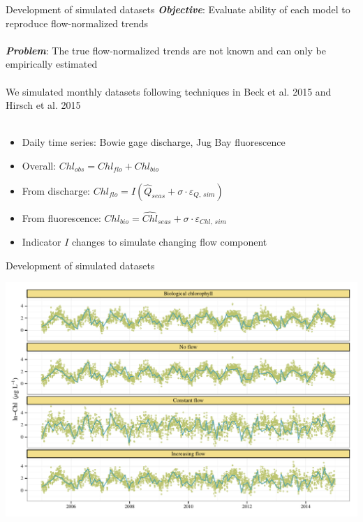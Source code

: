 \documentclass[serif]{beamer}\usepackage[]{graphicx}\usepackage[]{color}
\makeatletter
\def\maxwidth{ %
  \ifdim\Gin@nat@width>\linewidth
    \linewidth
  \else
    \Gin@nat@width
  \fi
}
\newenvironment{knitrout}{}{} %
\newcommand{\Bigtxt}[1]{\textbf{\textit{#1}}}
\makeatother
\begin{document}
\begin{frame}{Development of simulated datasets}
\Bigtxt{Objective}: Evaluate ability of each model to reproduce flow-normalized trends\\~\\
\Bigtxt{Problem}: The true flow-normalized trends are not known and can only be empirically estimated \\~\\
We simulated monthly datasets following techniques in Beck et al. 2015 and Hirsch et al. 2015 \\~\\
\begin{itemize}
\item Daily time series: Bowie gage discharge, Jug Bay fluorescence
\item Overall: $Chl_{obs} = Chl_{flo} + Chl_{bio}$
\item From discharge: $Chl_{flo} = I\left(\widehat{Q}_{seas} + \sigma\cdot\varepsilon_{Q,\,sim}\right)$
\item From fluorescence: $Chl_{bio} = \widehat{Chl}_{seas} + \sigma\cdot\varepsilon_{Chl,\,sim}$
\item Indicator $I$ changes to simulate changing flow component
\end{itemize}
\end{frame}

\begin{frame}[fragile]{Development of simulated datasets}
\begin{knitrout}
\color{fgcolor}

{\centering \includegraphics[width=\maxwidth]{figs/unnamed-chunk-2-1} 

}



\end{knitrout}
\end{frame}
\end{document}
